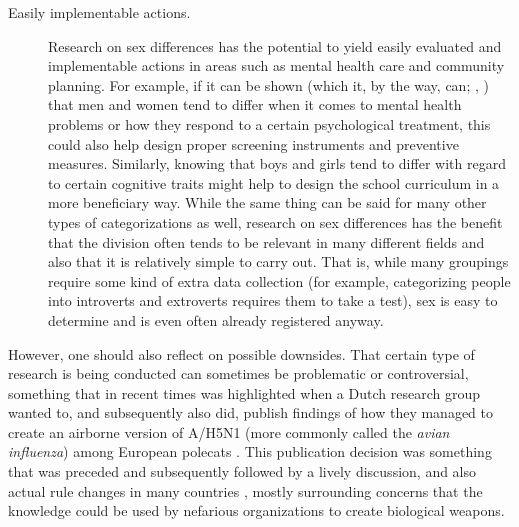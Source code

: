 \begin{description}
\item [Easily implementable actions.] Research on sex differences has the potential to yield easily evaluated and implementable actions in areas such as mental health care and community planning. For example, if it can be shown (which it, by the way, can; \citeauthor{Rosenfield2013}, \citeyear{Rosenfield2013}) that men and women tend to differ when it comes to mental health problems or how they respond to a certain psychological treatment, this could also help design proper screening instruments and preventive measures. Similarly, knowing that boys and girls tend to differ with regard to certain cognitive traits might help to design the school curriculum in a more beneficiary way. While the same thing can be said for many other types of categorizations as well, research on sex differences has the benefit that the division often tends to be relevant in many different fields and also that it is relatively simple to carry out. That is, while many groupings require some kind of extra data collection (for example, categorizing people into introverts and extroverts requires them to take a test), sex is easy to determine and is even often already registered anyway. \end{description}

However, one should also reflect on possible downsides. That certain type of research is being conducted can sometimes be problematic or controversial, something that in recent times was highlighted when a Dutch research group wanted to, and subsequently also did, publish findings of how they managed to create an airborne version of A/H5N1 (more commonly called the \emph{avian influenza}) among European polecats \parencite{Herfst2012,Russell2012}. This publication decision was something that was preceded and subsequently followed by a lively discussion, and also actual rule changes in many countries \parencite{Sills2013}, mostly surrounding concerns that the knowledge could be used by nefarious organizations to create biological weapons.

